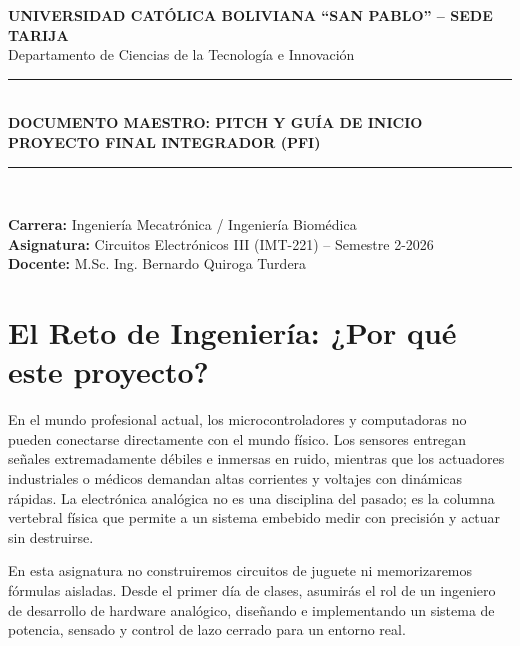 \documentclass[11pt, a4paper]{article}
\begin{document}
\begin{center}
    {\Large \textbf{UNIVERSIDAD CATÓLICA BOLIVIANA ``SAN PABLO'' – SEDE TARIJA}}\\[0.2cm]
    {\large Departamento de Ciencias de la Tecnología e Innovación}\\[0.5cm]
    
    \rule{\textwidth}{0.5pt}\\[0.4cm]
    {\huge \textbf{DOCUMENTO MAESTRO: PITCH Y GUÍA DE INICIO}}\\[0.2cm]
    {\Large \textbf{PROYECTO FINAL INTEGRADOR (PFI)}}\\[0.2cm]
    \rule{\textwidth}{0.5pt}\\[0.5cm]
\end{center}

\begin{flushleft}
    \textbf{Carrera:} Ingeniería Mecatrónica / Ingeniería Biomédica \\
    \textbf{Asignatura:} Circuitos Electrónicos III (IMT-221) – Semestre 2-2026 \\
    \textbf{Docente:} M.Sc. Ing. Bernardo Quiroga Turdera
\end{flushleft}

\vspace{0.5cm}

\section{El Reto de Ingeniería: ¿Por qué este proyecto?}

En el mundo profesional actual, los microcontroladores y computadoras no pueden conectarse directamente con el mundo físico. Los sensores entregan señales extremadamente débiles e inmersas en ruido, mientras que los actuadores industriales o médicos demandan altas corrientes y voltajes con dinámicas rápidas. La electrónica analógica no es una disciplina del pasado; es la columna vertebral física que permite a un sistema embebido medir con precisión y actuar sin destruirse.

En esta asignatura no construiremos circuitos de juguete ni memorizaremos fórmulas aisladas. Desde el primer día de clases, asumirás el rol de un ingeniero de desarrollo de hardware analógico, diseñando e implementando un sistema de potencia, sensado y control de lazo cerrado para un entorno real.
\end{document}

